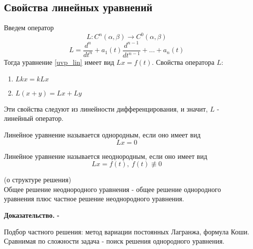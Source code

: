 \subsection{Свойства линейных уравнений}
Введем оператор 
$$L\colon C^n(\alpha,\beta)\to C^0(\alpha,\beta)$$
$$L = \frac{d^n}{dt^n}+a_1(t) \frac{d^{n-1}}{dt^{n-1}}+...+
a_n(t)$$
Тогда уравнение \ref{uvp_lin} имеет вид  $Lx=f(t)$. 
Свойства оператора $L$:
 \begin{enumerate}
    \item $Lkx=kLx$
    \item $L(x+y)=Lx+Ly$
\end{enumerate}
Эти свойства следуют из линейности дифференцирования, и значит, $L$ - 
линейный оператор. 
\begin{defin}
Линейное уравнение называется однородным, если оно имеет вид
\begin{equation}\label{lin_odnor}
    Lx=0
\end{equation}
\end{defin}
\begin{defin}
Линейное уравнение называется неоднородным, если оно имеет вид
 \begin{equation}
    Lx=f(t),~f(t)\not\equiv 0
\end{equation}
\end{defin}
\begin{theor} (о структуре решения)\\
Общее решение неоднородного уравнения - общее решение однородного уравнения
плюс частное решение неоднородного уравнения. 
\end{theor}
\textbf{Доказательство.}  
$\square$ 

Подбор частного решения: метод вариации постоянных Лагранжа, формула Коши.
Сравнимая по сложности задача - поиск решения однородного уравнения.
